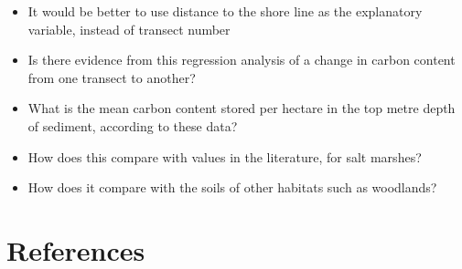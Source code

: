 \documentclass[
  letterpaper,
  DIV=11,
  numbers=noendperiod]{scrreprt}
\providecommand{\tightlist}{%
  \setlength{\itemsep}{0pt}\setlength{\parskip}{0pt}}\usepackage{longtable,booktabs,array}
\newlength{\cslhangindent}
\newenvironment{CSLReferences}[2] %
 {\begin{list}{}{%
  \setlength{\itemindent}{0pt}
  \setlength{\leftmargin}{0pt}
  \setlength{\parsep}{0pt}
  \ifodd #1
   \setlength{\leftmargin}{\cslhangindent}
   \setlength{\itemindent}{-1\cslhangindent}
  \fi
  \setlength{\itemsep}{#2\baselineskip}}}
 {\end{list}}
\begin{document}
\begin{itemize}
\tightlist
\item
  It would be better to use distance to the shore line as the
  explanatory variable, instead of transect number
\item
  Is there evidence from this regression analysis of a change in carbon
  content from one transect to another?
\item
  What is the mean carbon content stored per hectare in the top metre
  depth of sediment, according to these data?
\item
  How does this compare with values in the literature, for salt marshes?
\item
  How does it compare with the soils of other habitats such as
  woodlands?
\end{itemize}


\chapter*{References}\label{references}


\label{refs}
\begin{CSLReferences}{0}{1}
\end{CSLReferences}
\end{document}
